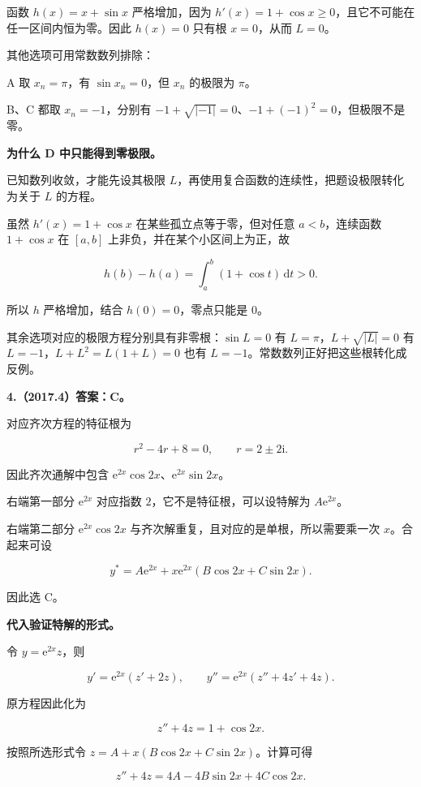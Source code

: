 \documentclass[UTF8,11pt,fontset=windows]{ctexart}
\begin{document}
函数 $h(x)=x+\sin x$ 严格增加，因为 $h'(x)=1+\cos x\ge0$，且它不可能在任一区间内恒为零。因此 $h(x)=0$ 只有根 $x=0$，从而 $L=0$。

其他选项可用常数数列排除：

A 取 $x_n=\pi$，有 $\sin x_n=0$，但 $x_n$ 的极限为 $\pi$。

B、C 都取 $x_n=-1$，分别有 $-1+\sqrt{|-1|}=0$、$-1+(-1)^2=0$，但极限不是零。

\textbf{为什么 D 中只能得到零极限。}

已知数列收敛，才能先设其极限 $L$，再使用复合函数的连续性，把题设极限转化为关于 $L$ 的方程。

虽然 $h'(x)=1+\cos x$ 在某些孤立点等于零，但对任意 $a<b$，连续函数 $1+\cos x$ 在 $[a,b]$ 上非负，并在某个小区间上为正，故

$$
h(b)-h(a)=\int_a^b(1+\cos t)\,\mathrm dt>0.
$$

所以 $h$ 严格增加，结合 $h(0)=0$，零点只能是 $0$。

其余选项对应的极限方程分别具有非零根：$\sin L=0$ 有 $L=\pi$，$L+\sqrt{|L|}=0$ 有 $L=-1$，$L+L^2=L(1+L)=0$ 也有 $L=-1$。常数数列正好把这些根转化成反例。

\clearpage

\textbf{4.（2017.4）答案：C。}

对应齐次方程的特征根为

$$
r^2-4r+8=0,
\qquad r=2\pm2\mathrm i.
$$

因此齐次通解中包含 $\mathrm e^{2x}\cos2x$、$\mathrm e^{2x}\sin2x$。

右端第一部分 $\mathrm e^{2x}$ 对应指数 $2$，它不是特征根，可以设特解为 $A\mathrm e^{2x}$。

右端第二部分 $\mathrm e^{2x}\cos2x$ 与齐次解重复，且对应的是单根，所以需要乘一次 $x$。合起来可设

$$
y^*=A\mathrm e^{2x}+x\mathrm e^{2x}(B\cos2x+C\sin2x).
$$

因此选 C。

\textbf{代入验证特解的形式。}

令 $y=\mathrm e^{2x}z$，则

$$
y'=\mathrm e^{2x}(z'+2z),\qquad
y''=\mathrm e^{2x}(z''+4z'+4z).
$$

原方程因此化为

$$
z''+4z=1+\cos2x.
$$

按照所选形式令 $z=A+x(B\cos2x+C\sin2x)$。计算可得

$$
z''+4z=4A-4B\sin2x+4C\cos2x.
$$
\end{document}
